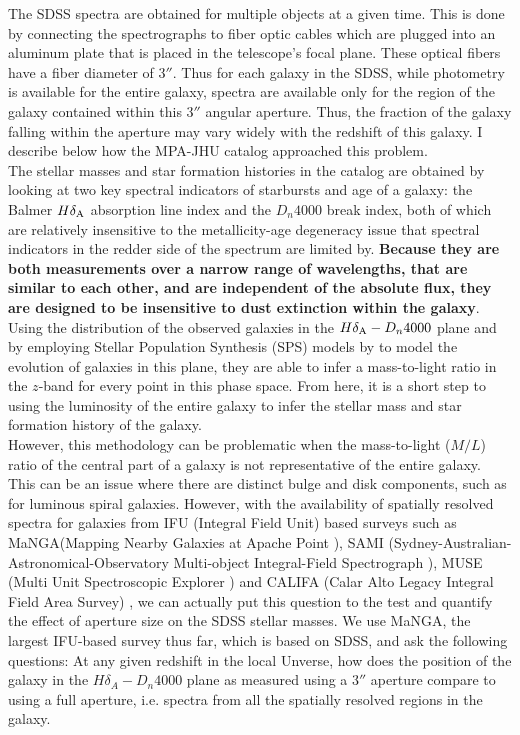 The SDSS spectra are obtained for multiple objects at a given time. This is done by connecting the spectrographs to fiber optic cables which are plugged into an aluminum plate that is placed in the telescope's focal plane. These optical fibers have a fiber diameter of $3''$. Thus for each galaxy in the SDSS, while photometry is available for the entire galaxy, spectra are available only for the region of the galaxy contained within this $3''$ angular aperture. Thus, the fraction of the galaxy falling within the aperture may vary widely with the redshift of this galaxy. I describe below how the MPA-JHU catalog approached this problem.\\
The stellar masses and star formation histories in the catalog are obtained by looking at two key spectral indicators of starbursts and age of a galaxy: the Balmer $H\delta_{\rm A}$ absorption line index and the $D_{n}4000$ break index, both of which are relatively insensitive to the metallicity-age degeneracy issue that spectral indicators in the redder side of the spectrum are limited by. {\bf Because they are both measurements over a narrow range of wavelengths, that are similar to each other, and are independent of the absolute flux, they are designed to be insensitive to dust extinction within the galaxy}. Using the distribution of the observed galaxies in the $H\delta_{\rm A}-D_{n}4000$ plane and by employing Stellar Population Synthesis (SPS) models by \citet{bruzual_stellar_2003-1} to model the evolution of galaxies in this plane, they are able to infer a mass-to-light ratio in the $z$-band \citep{kauffmann_stellar_2003} for every point in this phase space. From here, it is a short step to using the luminosity of the entire galaxy to infer the stellar mass and star formation history of the galaxy.\\
However, this methodology can be problematic when the mass-to-light ($M/L$) ratio of the central part of a galaxy is not representative of the entire galaxy. This can be an issue where there are distinct bulge and disk components, such as for luminous spiral galaxies. However, with the availability of spatially resolved spectra for galaxies from IFU (Integral Field Unit) based surveys such as MaNGA(Mapping Nearby Galaxies at Apache Point \citep{bundy_overview_2014}), SAMI (Sydney-Australian-Astronomical-Observatory Multi-object Integral-Field Spectrograph \citep{bryant_sami_2015}), MUSE (Multi Unit Spectroscopic Explorer \citep{bacon_muse_2015}) and CALIFA (Calar Alto Legacy Integral Field Area Survey) \citep{sanchez_califa_2012}, we can actually put this question to the test and quantify the effect of aperture size on the SDSS stellar masses. We use MaNGA, the largest IFU-based survey thus far, which is based on SDSS, and ask the following questions: At any given redshift in the local Unverse, how does the position of the galaxy in the $H\delta_{A}-D_{n}4000$ plane as measured using a $3''$ aperture compare to using a full aperture, i.e. spectra from all the spatially resolved regions in the galaxy.\\ 

